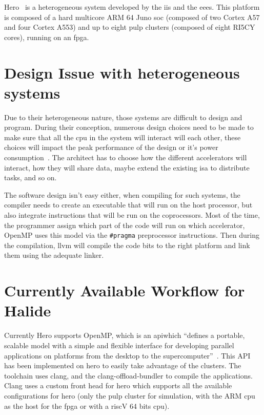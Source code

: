     Hero~\cite{Art:Hero} is a heterogeneous system developed by the \gls{iis} and the \gls{eees}. This platform is composed of a hard multicore ARM 64 Juno \gls{soc} (composed of two Cortex A57 and four Cortex A553) and up to eight \gls{pulp} clusters (composed of eight RI5CY cores), running on an \gls{fpga}.

\section {Design Issue with heterogeneous systems}
    Due to their heterogeneous nature, those systems are difficult to design and program. During their conception, numerous design choices need to be made to make sure that all the \gls{cpu} in the system will interact will each other, these choices will impact the peak performance of the design or it's power consumption~\cite{Art:Harnessing}. The architect has to choose how  the different accelerators will interact, how they will share data, maybe extend the existing \gls{isa} to distribute tasks, and so on.

    The software design isn't easy either, when compiling for such systems, the compiler needs to create an executable that will run on the host processor, but also integrate instructions that will be run on the coprocessors. Most of the time, the programmer assign which part of the code will run on which accelerator, OpenMP uses this model via the \verb|#pragma| preprocessor instructions. Then during the compilation, llvm will compile the code bits to the right platform and link them using the adequate linker.



\section {Currently Available Workflow for Halide}
    Currently Hero supports OpenMP, which is an \gls{api}which ``defines a portable, scalable model with a simple and flexible interface for developing parallel applications on platforms from the desktop to the supercomputer''~\cite{Web:OpenMp}. This API has been implemented on hero to easily take advantage of the clusters. The toolchain uses clang, and the clang-offload-bundler to compile the applications. Clang uses a custom front head for hero which supports all the available configurations for hero (only the pulp cluster for simulation, with the ARM \gls{cpu} as the host for the \gls{fpga} or with a riscV 64 bits \gls{cpu}).

